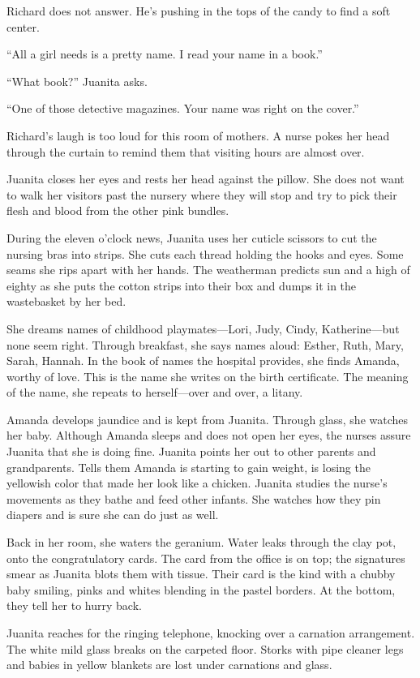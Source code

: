 \documentclass[
]{article}
\begin{document}
Richard does not answer. He's pushing in the tops of the candy to find a
soft center.

``All a girl needs is a pretty name. I read your name in a book.''

``What book?'' Juanita asks.

``One of those detective magazines. Your name was right on the cover.''

Richard's laugh is too loud for this room of mothers. A nurse pokes her
head through the cur­tain to remind them that visiting hours are almost
over.

Juanita closes her eyes and rests her head against the pillow. She does
not want to walk her visitors past the nursery where they will stop and
try to pick their flesh and blood from the other pink bundles.

During the eleven o'clock news, Juanita uses her cuticle scissors to cut
the nursing bras into strips. She cuts each thread holding the hooks and
eyes. Some seams she rips apart with her hands. The weatherman predicts
sun and a high of eighty as she puts the cotton strips into their box
and dumps it in the wastebasket by her bed.

She dreams names of childhood playmates---Lori, Judy, Cindy,
Katherine---but none seem right. Through breakfast, she says names
aloud: Esther, Ruth, Mary, Sarah, Hannah. In the book of names the
hospital provides, she finds Amanda, worthy of love. This is the name
she writes on the birth cer­tificate. The meaning of the name, she
repeats to herself---over and over, a litany.

Amanda develops jaundice and is kept from Juanita. Through glass, she
watches her baby. Although Amanda sleeps and does not open her eyes, the
nurses assure Juanita that she is doing fine. Juanita points her out to
other parents and grandparents. Tells them Amanda is starting to gain
weight, is losing the yellowish color that made her look like a chicken.
Juanita studies the nurse's movements as they bathe and feed other
infants. She watches how they pin diapers and is sure she can do just as
well.

Back in her room, she waters the geranium. Water leaks through the clay
pot, onto the congratulatory cards. The card from the office is on top;
the signatures smear as Juanita blots them with tissue. Their card is
the kind with a chubby baby smiling, pinks and whites blending in the
pastel borders. At the bottom, they tell her to hurry back.

Juanita reaches for the ringing telephone, knocking over a carnation
arrangement. The white mild glass breaks on the carpeted floor. Storks
with pipe cleaner legs and babies in yellow blankets are lost under
carnations and glass.
\end{document}
